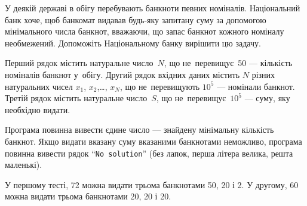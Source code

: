 ﻿У деякій державі в обігу перебувають банкноти певних номіналів. 
Національний банк хоче, щоб банкомат видавав будь-яку запитану суму 
за допомогою мінімального числа банкнот, вважаючи, 
що запас банкнот кожного номіналу необмежений. 
Допоможіть Національному банку вирішити цю задачу.

\InputFile
Перший рядок містить натуральне число~$N$, 
що не~перевищує~50 --- кількість номіналів банкнот у~обігу. 
Другий рядок вхідних даних містить $N$ різних натуральних чисел 
$x_1$, $x_2$,\dots, $x_N$, 
що не~перевищують $10^5$ --- номінали банкнот. 
Третій рядок містить натуральне число~$S$, 
що не~перевищує~$10^5$ --- суму, яку необхідно видати.

\OutputFile
Програма повинна вивести єдине число --- знайдену мінімальну кількість банкнот.
Якщо видати вказану суму вказаними банкнотами неможливо, програма повинна вивести рядок 
``{\tt No solution}'' (без лапок, перша літера велика, решта маленькі).

\Examples

\begin{example}     
\end{example}

\Note

У першому тесті, 72 можна видати трьома банкнотами 50, 20 і 2. У другому, 60 можна видати трьома банкнотами 20, 20 і 20. 